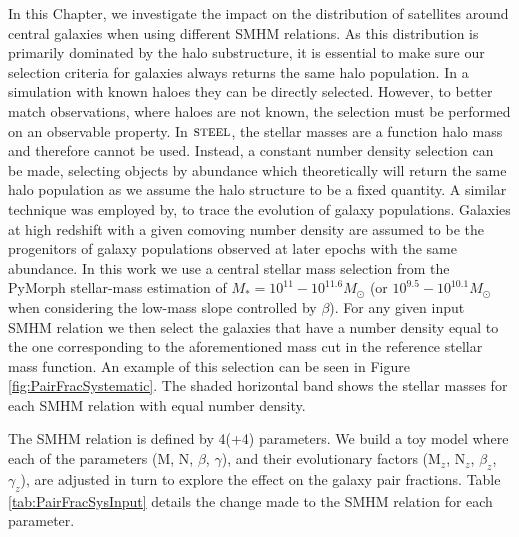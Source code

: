 In this Chapter, we investigate the impact on the distribution of satellites around central galaxies when using different SMHM relations. 
As this distribution is primarily dominated by the halo substructure, it is essential to make sure our selection criteria for galaxies always returns the same halo population. 
In a simulation with known haloes they can be directly selected. However, to better match observations, where haloes are not known, the selection must be performed on an observable property.
In $\textsc{steel}$, the stellar masses are a function halo mass and therefore cannot be used.
Instead, a constant number density selection can be made, selecting objects by abundance which theoretically will return the same halo population as we assume the halo structure to be a fixed quantity.
A similar technique was employed by, \citet[e.g.][]{vanDokkum2013The2.5, Huertas-Company2016MassCANDELS, Leja2013TRACINGSELECTION, Mundy2015Tracing3} to trace the evolution of galaxy populations. Galaxies at high redshift with a given comoving number density are assumed to be the progenitors of galaxy populations observed at later epochs with the same abundance. 
In this work we use a central stellar mass selection from the PyMorph stellar-mass estimation of $M_{*} = 10^{11} - 10^{11.6} M_{\odot}$ (or $10^{9.5} - 10^{10.1} M_{\odot}$ when considering the low-mass slope controlled by $\beta$). For any given input SMHM relation we then select the galaxies that have a number density equal to the one corresponding to the aforementioned mass cut in the reference stellar mass function.
An example of this selection can be seen in Figure \ref{fig:PairFracSystematic}.
The shaded horizontal band shows the stellar masses for each SMHM relation with equal number density.

The SMHM relation is defined by 4(+4) parameters. We build a toy model where each of the parameters (M, N, $\beta$, $\gamma$), and their evolutionary factors (M$_z$, N$_z$, $\beta_z$, $\gamma_z$), are adjusted in turn to explore the effect on the galaxy pair fractions. Table \ref{tab:PairFracSysInput} details the change made to the SMHM relation for each parameter. 


